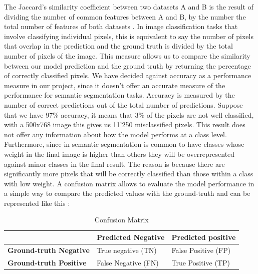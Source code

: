 \documentclass[12pt,a4paper]{scrartcl}
\begin{document}
The Jaccard's similarity coefficient between two datasets A and B is the result of dividing the number of common features between A and B, by the number the total number of features of both datasets \cite{Niwattanakul2013}.
In image classification tasks that involve classifying individual pixels, this is equivalent to say the number of pixels that overlap in the prediction and the ground truth is divided by the total number of pixels of the image. This measure allows us to compare the similarity between our model prediction and the ground truth by returning the percentage of correctly classified pixels. 
We have decided against accuracy as a performance measure in our project, since it doesn't offer an accurate measure of the performance for semantic segmentation tasks. Accuracy is measured by the number of correct predictions out of the total number of predictions. Suppose that we have 97\% accuracy, it means that 3\% of the pixels are not well classified, with a 500x768 image this gives us 11'250 misclassified pixels. This result does not offer any information about how the model performs at a class level. Furthermore, since in semantic segmentation is common to have classes whose weight in the final image is higher than others they will be overrepresented against minor classes in the final result. The reason is because there are significantly more pixels that will be correctly classified than those within a class with low weight. 
A confusion matrix allows to evaluate the model performance in a simple way to compare the predicted values with the ground-truth and can be represented like this \cite{ConfusionMatrix}:
    \begin{table}[H]
        \begin{tabular}{lll}
        \cline{2-3}
            \multicolumn{1}{l|}{}                                 & \multicolumn{1}{l|}{\textbf{Predicted Negative}} & \multicolumn{1}{l|}{\textbf{Predicted positive}} \\ \hline
            \multicolumn{1}{|l|}{\textbf{Ground-truth Negative}} & \multicolumn{1}{l|}{True negative (TN)}          & \multicolumn{1}{l|}{False Positive (FP)}         \\ \hline
            \multicolumn{1}{|l|}{\textbf{Ground-truth Positive}}  & \multicolumn{1}{l|}{False Negative (FN)}         & \multicolumn{1}{l|}{True Positive (TP)}          \\ \hline
        \end{tabular}
        \caption{Confusion Matrix}
    \end{table}
\end{document}
